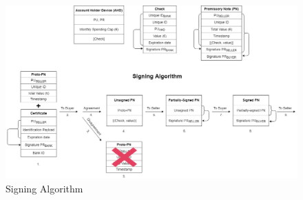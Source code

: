 \documentclass[12pt,a4paper]{article}
\begin{document}
	\begin{landscape}
	\thispagestyle{empty}
	
	\begin{figure}
		\centering
		\includegraphics[width=503pt]{img/signing_algorithm}
		\caption{Signing Algorithm}
		\label{fig:signing_algorithm}
	\end{figure}
	
	\vfill
	\raisebox{1em}{\makebox[\linewidth]{\thepage}}
	\end{landscape}
	
\end{document}
